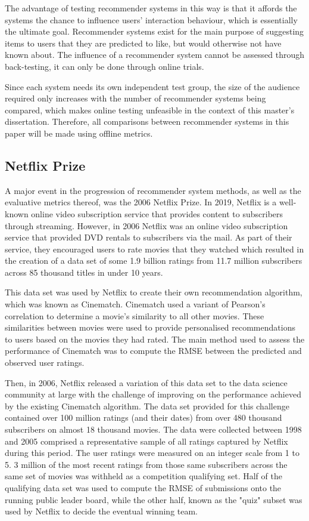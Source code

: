The advantage of testing recommender systems in this way is that it affords the systems the chance to influence users' interaction behaviour, which is essentially the ultimate goal. Recommender systems exist for the main purpose of suggesting items to users that they are predicted to like, but would otherwise not have known about. The influence of a recommender system cannot be assessed through back-testing, it can only be done through online trials. \parencite{handbook_1.4_neighbourhood}

Since each system needs its own independent test group, the size of the audience required only increases with the number of recommender systems being compared, which makes online testing unfeasible in the context of this master's dissertation. Therefore, all comparisons between recommender systems in this paper will be made using offline metrics.

\subsection{Netflix Prize}
A major event in the progression of recommender system methods, as well as the evaluative metrics thereof, was the 2006 Netflix Prize. In 2019, Netflix is a well-known online video subscription service that provides content to subscribers through streaming. However, in 2006 Netflix was an online video subscription service that provided DVD rentals to subscribers via the mail. As part of their service, they encouraged users to rate movies that they watched which resulted in the creation of a data set of some 1.9 billion ratings from 11.7 million subscribers across 85 thousand titles in under 10 years. \parencite{netflix_description}

This data set was used by Netflix to create their own recommendation algorithm, which was known as Cinematch. Cinematch used a variant of Pearson's correlation to determine a movie's similarity to all other movies. These similarities between movies were used to provide personalised recommendations to users based on the movies they had rated. The main method used to assess the performance of Cinematch was to compute the RMSE between the predicted and observed user ratings. \parencite{netflix_description}

Then, in 2006, Netflix released a variation of this data set to the data science community at large with the challenge of improving on the performance achieved by the existing Cinematch algorithm. The data set provided for this challenge contained over 100 million ratings (and their dates) from over 480 thousand subscribers on almost 18 thousand movies. The data were collected between 1998 and 2005 comprised a representative sample of all ratings captured by Netflix during this period. The user ratings were measured on an integer scale from 1 to 5. 3 million of the most recent ratings from those same subscribers across the same set of movies was withheld as a competition qualifying set. Half of the qualifying data set was used to compute the RMSE of submissions onto the running public leader board, while the other half, known as the "quiz" subset was used by Netflix to decide the eventual winning team. \parencite{netflix_description}

